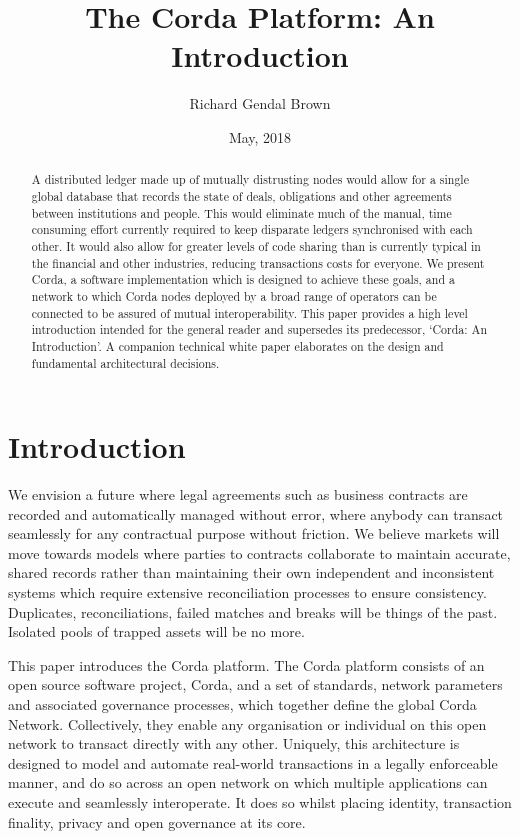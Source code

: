 \documentclass{article}
\author{Richard Gendal Brown}
\date{May, 2018}
\title{The Corda Platform: An Introduction}
\begin{document}
\maketitle 

\begin{abstract}

A distributed ledger made up of mutually distrusting nodes would allow for a single global database that records the state of deals, obligations and other agreements between institutions and people. This would eliminate much of the manual, time consuming effort currently required to keep disparate ledgers synchronised with each other. It would also allow for greater levels of code sharing than is currently typical in the financial and other industries, reducing transactions costs for everyone. We present Corda, a software implementation which is designed to achieve these goals, and a network to which Corda nodes deployed by a broad range of operators can be connected to be assured of mutual interoperability. This paper provides a high level introduction intended for the general reader and supersedes its predecessor, `Corda: An Introduction'\cite{CordaIntro}. A companion technical white paper\cite{CordaTech} elaborates on the design and fundamental architectural decisions.
\end{abstract}
\newpage
\tableofcontents
\newpage
\section{Introduction}
We envision a future where legal agreements such as business contracts are recorded and automatically managed without error, where anybody can transact seamlessly for any contractual purpose without friction. We believe markets will move towards models where parties to contracts collaborate to maintain accurate, shared records rather than maintaining their own independent and inconsistent systems which require extensive reconciliation processes to ensure consistency. Duplicates, reconciliations, failed matches and breaks will be things of the past. Isolated pools of trapped assets will be no more.

This paper introduces the Corda platform. The Corda platform consists of an open source software project, Corda, and a set of standards, network parameters and associated governance processes, which together define the global Corda Network. Collectively, they enable any organisation or individual on this open network to transact directly with any other. Uniquely, this architecture is designed to model and automate real-world transactions in a legally enforceable manner, and do so across an open network on which multiple applications can execute and seamlessly interoperate. It does so whilst placing identity, transaction finality, privacy and open governance at its core.
\end{document}
